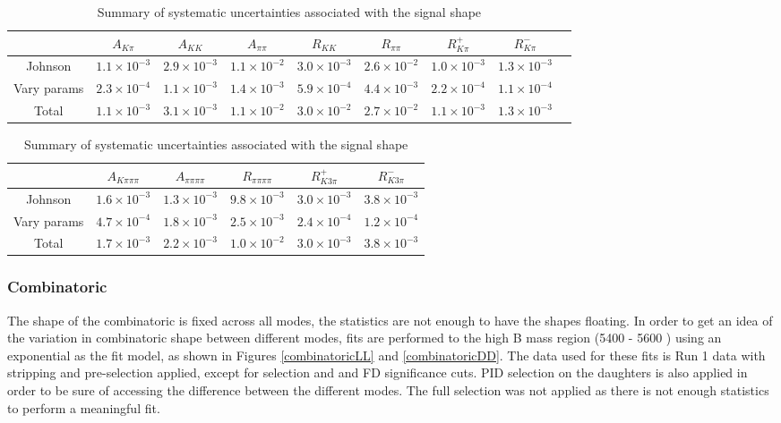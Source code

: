 \begin{table}[h]
\centering
{\footnotesize
\begin{tabular}{ccccccccc}
\hline
& $A_{K\pi}$ & $A_{KK}$ & $A_{\pi\pi}$ & $R_{KK}$ & $R_{\pi\pi}$ & $R^+_{K\pi}$ & $R^-_{K\pi}$ \\
\hline
Johnson & $1.1 \times 10^{-3}$ & $2.9 \times 10^{-3}$ & $1.1 \times 10^{-2}$ & $3.0 \times 10^{-3}$ & $2.6 \times 10^{-2}$ & $1.0 \times 10^{-3}$ & $1.3 \times 10^{-3}$ \\
Vary params & $2.3 \times 10^{-4}$ & $1.1 \times 10^{-3}$ & $1.4 \times 10^{-3}$ & $5.9 \times 10^{-4}$ & $4.4 \times 10^{-3}$ & $2.2 \times 10^{-4}$ & $1.1 \times 10^{-4}$ \\
\hline
Total & $1.1 \times 10^{-3}$ & $3.1 \times 10^{-3}$ & $1.1 \times 10^{-2}$ & $3.0 \times 10^{-2}$ & $2.7 \times 10^{-2}$ & $1.1 \times 10^{-3}$ & $1.3 \times 10^{-3}$ \\
\hline
\end{tabular}
\begin{tabular}{cccccc}
\hline
& $A_{K\pi\pi\pi}$ & $A_{\pi\pi\pi\pi}$ & $R_{\pi\pi\pi\pi}$ & $R^+_{K3\pi}$ & $R^-_{K3\pi}$ \\
\hline
Johnson & $1.6 \times 10^{-3}$ & $1.3 \times 10^{-3}$ & $9.8 \times 10^{-3}$ & $3.0 \times 10^{-3}$ & $3.8 \times 10^{-3}$ \\
Vary params & $4.7 \times 10^{-4}$ & $1.8 \times 10^{-3}$ & $2.5 \times 10^{-3}$ & $2.4 \times 10^{-4}$ & $1.2 \times 10^{-4}$ \\
\hline
Total & $1.7 \times 10^{-3}$ & $2.2 \times 10^{-3}$ & $1.0 \times 10^{-2}$ & $3.0 \times 10^{-3}$ & $3.8 \times 10^{-3}$ \\
\hline
\end{tabular}}
\caption{Summary of systematic uncertainties associated with the signal shape}
\label{signalshapeSystematics}
\end{table}

\subsubsection{Combinatoric}

The shape of the combinatoric is fixed across all \D modes, the statistics are not enough to have the shapes floating. In order to get an idea of the variation in combinatoric shape between different \D modes, fits are performed to the high B mass region (5400 - 5600 \mevcc) using an exponential as the fit model, as shown in Figures \ref{combinatoricLL} and \ref{combinatoricDD}. The data used for these fits is Run 1 data with stripping and pre-selection applied, except for \Kstar selection and \Dz and \KS FD significance cuts. PID selection on the \D daughters is also applied in order to be sure of accessing the difference between the different \D modes. The full selection was not applied as there is not enough statistics to perform a meaningful fit.

